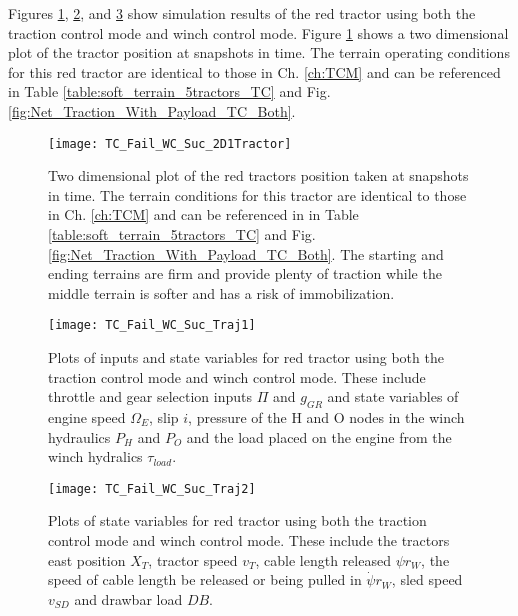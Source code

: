 Figures \ref{fig:TC_Fail_WC_Suc_2D1Tractor}, \ref{fig:TC_Fail_WC_Suc_Traj1}, and \ref{fig:TC_Fail_WC_Suc_Traj2} show simulation results of the red tractor using both the traction control mode and winch control mode. Figure \ref{fig:TC_Fail_WC_Suc_2D1Tractor} shows a two dimensional plot of the tractor position at snapshots in time. The terrain operating conditions for this red tractor are identical to those in Ch. \ref{ch:TCM} and can be referenced in Table \ref{table:soft_terrain_5tractors_TC} and Fig. \ref{fig:Net_Traction_With_Payload_TC_Both}.
\begin{figure}[tp]
    \centering
    \texttt{[image: TC\_Fail\_WC\_Suc\_2D1Tractor]}
    \caption{Two dimensional plot of the red tractors position taken at snapshots in time. The terrain conditions for this tractor are identical to those in Ch. \ref{ch:TCM} and can be referenced in in Table \ref{table:soft_terrain_5tractors_TC} and Fig. \ref{fig:Net_Traction_With_Payload_TC_Both}. The starting and ending terrains are firm and provide plenty of traction while the middle terrain is softer and has a risk of immobilization.}
    \label{fig:TC_Fail_WC_Suc_2D1Tractor}
\end{figure}
\begin{figure}[htbp]
    \centering
    \texttt{[image: TC\_Fail\_WC\_Suc\_Traj1]}
    \caption{Plots of inputs and state variables for red tractor using both the traction control mode and winch control mode. These include throttle and gear selection inputs $\Pi$ and $g_{GR}$ and state variables of engine speed $\Omega_E$, slip $i$, pressure of the H and O nodes in the winch hydraulics $P_H$ and $P_O$ and the load placed on the engine from the winch hydralics $\tau_{load}$.}
    \label{fig:TC_Fail_WC_Suc_Traj1}
\end{figure}
\begin{figure}[htb]
    \centering
    \texttt{[image: TC\_Fail\_WC\_Suc\_Traj2]}
    \caption{Plots of state variables for red tractor using both the traction control mode and winch control mode. These include the tractors east position $X_T$, tractor speed $v_T$, cable length released $\psi r_W$, the speed of cable length be released or being pulled in $\dot{\psi} r_W$, sled speed $v_{SD}$ and drawbar load $DB$.}
    \label{fig:TC_Fail_WC_Suc_Traj2}
\end{figure}
